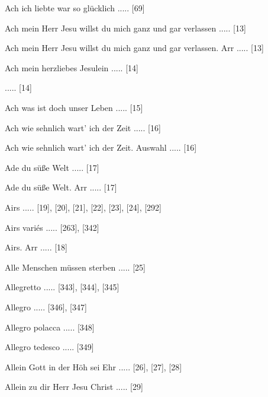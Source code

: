 \documentclass[twocolumn, 12pt]{book}
\begin{document}
\newline 
Ach ich liebte war so glücklich ..... [69]

\newline 
Ach mein Herr Jesu willst du mich ganz und gar verlassen ..... [13]

\newline 
Ach mein Herr Jesu willst du mich ganz und gar verlassen. Arr ..... [13]

\newline 
Ach mein herzliebes Jesulein ..... [14]

 ..... [14]

\newline 
Ach was ist doch unser Leben ..... [15]

\newline 
Ach wie sehnlich wart' ich der Zeit ..... [16]

\newline 
Ach wie sehnlich wart' ich der Zeit. Auswahl ..... [16]

\newline 
Ade du süße Welt ..... [17]

\newline 
Ade du süße Welt. Arr ..... [17]

\newline 
Airs ..... [19], [20], [21], [22], [23], [24], [292]

\newline 
Airs variés ..... [263], [342]

\newline 
Airs. Arr ..... [18]

\newline 
Alle Menschen müssen sterben ..... [25]

\newline 
Allegretto ..... [343], [344], [345]

\newline 
Allegro ..... [346], [347]

\newline 
Allegro polacca ..... [348]

\newline 
Allegro tedesco ..... [349]

\newline 
Allein Gott in der Höh sei Ehr ..... [26], [27], [28]

\newline 
Allein zu dir Herr Jesu Christ ..... [29]
\end{document}
